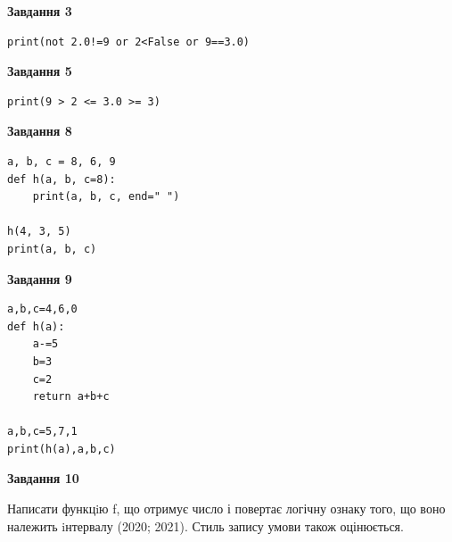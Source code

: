 \documentclass[12pt, ukrainian]{article}
\begin{document}
{\begin {large}
\begin{minipage}[t]{7.5cm}
\end{minipage}
\vline \hspace{6mm}
\begin{minipage}[t]{10.5cm}

\begin{center}
\textbf{Завдання 3}
\end{center}

\begin{verbatim}
print(not 2.0!=9 or 2<False or 9==3.0)
\end{verbatim}



\begin{center}
\textbf{Завдання 5}
\end{center}

\begin{verbatim}
print(9 > 2 <= 3.0 >= 3)
\end{verbatim}



\begin{center}
\textbf{Завдання 8}
\end{center}

\begin{verbatim}
a, b, c = 8, 6, 9
def h(a, b, c=8):
    print(a, b, c, end=" ")

h(4, 3, 5)
print(a, b, c)
\end{verbatim}



\begin{center}
\textbf{Завдання 9}
\end{center}

\begin{verbatim}
a,b,c=4,6,0
def h(a):
    a-=5
    b=3
    c=2
    return a+b+c

a,b,c=5,7,1
print(h(a),a,b,c)
\end{verbatim}



\begin{center}
\textbf{Завдання 10}
\end{center}

Написати функцiю f, що отримує число і повертає логічну ознаку того, що воно належить iнтервалу (2020; 2021). Стиль запису умови також оцінюється.\par

\end{minipage}

\end {large}}
\newpage
\end{document}
